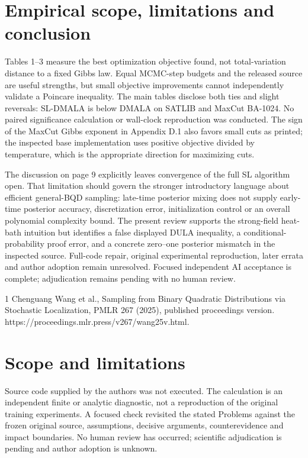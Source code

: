 \documentclass[10pt]{article}
\begin{document}
\section*{Empirical scope, limitations and conclusion}
Tables 1–3 measure the best optimization objective found, not total-variation distance to a fixed Gibbs law. Equal MCMC-step budgets and the released source are useful strengths, but small objective improvements cannot independently validate a Poincare inequality. The main tables disclose both ties and slight reversals: SL-DMALA is below DMALA on SATLIB and MaxCut BA-1024. No paired significance calculation or wall-clock reproduction was conducted. The sign of the MaxCut Gibbs exponent in Appendix D.1 also favors small cuts as printed; the inspected base implementation uses positive objective divided by temperature, which is the appropriate direction for maximizing cuts.\par
The discussion on page 9 explicitly leaves convergence of the full SL algorithm open. That limitation should govern the stronger introductory language about efficient general-BQD sampling: late-time posterior mixing does not supply early-time posterior accuracy, discretization error, initialization control or an overall polynomial complexity bound. The present review supports the strong-field heat-bath intuition but identifies a false displayed DULA inequality, a conditional-probability proof error, and a concrete zero–one posterior mismatch in the inspected source. Full-code repair, original experimental reproduction, later errata and author adoption remain unresolved. Focused independent AI acceptance is complete; adjudication remains pending with no human review.\par
1 Chenguang Wang et al., Sampling from Binary Quadratic Distributions via Stochastic Localization, PMLR 267 (2025), published proceedings version. https://proceedings.mlr.press/v267/wang25v.html.\par
\section*{Scope and limitations}
Source code supplied by the authors was not executed. The calculation is an independent finite or analytic diagnostic, not a reproduction of the original training experiments. A focused check revisited the stated Problems against the frozen original source, assumptions, decisive arguments, counterevidence and impact boundaries. No human review has occurred; scientific adjudication is pending and author adoption is unknown.\par
\end{document}
